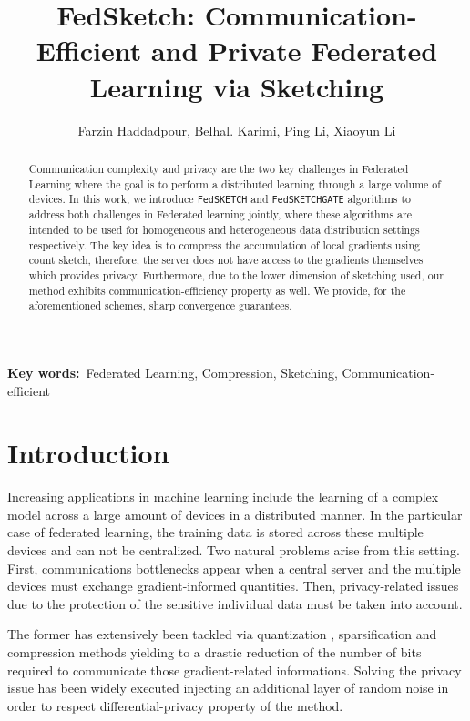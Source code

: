 \documentclass{article}
\begin{document}
\title{FedSketch: Communication-Efficient and Private Federated Learning via Sketching}

\author{Farzin Haddadpour, Belhal. Karimi, Ping Li, Xiaoyun Li}

\maketitle
\begin{abstract}
Communication complexity and privacy are the two key challenges in Federated Learning where the goal is to perform a distributed learning through a large volume of devices. 
In this work, we introduce \texttt{FedSKETCH} and \texttt{FedSKETCHGATE} algorithms to address both challenges in Federated learning jointly, where these algorithms are intended to be used for homogeneous and heterogeneous data distribution settings respectively. The key idea is to compress the accumulation of local gradients using count sketch, therefore, the server does not have access to the gradients themselves which provides privacy. Furthermore, due to the lower dimension of sketching used, our method exhibits communication-efficiency property as well. 
We provide, for the aforementioned schemes, sharp convergence guarantees. 
\end{abstract}



\noindent\textbf{Key words:}\  Federated Learning, Compression, Sketching, Communication-efficient

\newpage

\section{Introduction}
Increasing applications in machine learning include the learning of a complex model across a large amount of devices in a distributed manner.
In the particular case of federated learning, the training data is stored across these multiple devices and can not be centralized.
Two natural problems arise from this setting. 
First, communications bottlenecks appear when a central server and the multiple devices must exchange gradient-informed quantities.
Then, privacy-related issues due to the protection of the sensitive individual data must be taken into account.

The former has extensively been tackled via quantization \cite{alistarh2017qsgd}, sparsification \cite{wangni2018gradient} and compression \cite{bernstein2018signsgd} methods yielding to a drastic reduction of the number of bits required to communicate those gradient-related informations.
Solving the privacy issue has been widely executed injecting an additional layer of random noise in order to respect differential-privacy property of the method.
\end{document}
